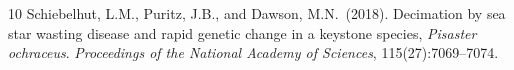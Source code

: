 \documentclass[11pt]{article}
\begin{document}
\begin{thebibliography}{10}
Schiebelhut, L.M., Puritz, J.B., and Dawson, M.N.\ (2018).
\newblock Decimation by sea star wasting disease and rapid genetic change in a keystone species, \textit{Pisaster ochraceus}.
\newblock \textit{Proceedings of the National Academy of Sciences}, 115(27):7069--7074.

\end{thebibliography}
\end{document}

